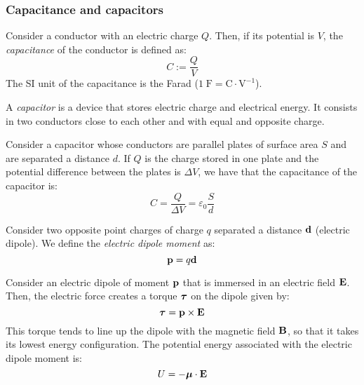 \documentclass[../../../main.tex]{subfiles}
\begin{document}
\begin{multicols}{2}
  \subsubsection*{Capacitance and capacitors}
  \begin{definition}[Capacitance]
    Consider a conductor with an electric charge $Q$. Then, if its potential is $V$, the \textit{capacitance} of the conductor is defined as: $$C:=\frac{Q}{V}$$
    The SI unit of the capacitance is the Farad ($1\;\text{F}=\text{C}\cdot\text{V}^{-1}$).
  \end{definition}
  \begin{definition}[Capacitor]
    A \textit{capacitor} is a device that stores electric charge and electrical energy. It consists in two conductors close to each other and with equal and opposite charge.
  \end{definition}
  \begin{prop}
    Consider a capacitor whose conductors are parallel plates of surface area $S$ and are separated a distance $d$. If $Q$ is the charge stored in one plate and the  potential difference between the plates is $\Delta V$, we have that the capacitance of the capacitor is: $$C=\frac{Q}{\Delta V}=\varepsilon_0\frac{S}{d}$$
  \end{prop}
  \begin{definition}
    Consider two opposite point charges of charge $q$ separated a distance $\vb{d}$ (electric dipole). We define the \textit{electric dipole moment} as: $$\vb{p}=q\vb{d}$$
  \end{definition}
  \begin{prop}
    Consider an electric dipole of moment $\vb{p}$ that is immersed in an electric field $\vb{E}$. Then, the electric force creates a torque $\vb*{\tau}$ on the dipole given by: $$\vb*{\tau}=\vb{p}\times\vb{E}$$ This torque tends to line up the dipole with the magnetic field $\vb{B}$, so that it takes its lowest energy configuration. The potential energy associated with the electric dipole moment is: $$U=-\vb*{\mu}\cdot\vb{E}$$
  \end{prop}
  \begin{center}
    \begin{minipage}{\linewidth}
      \centering
      
    \end{minipage}
  \end{center}

\end{multicols}
\end{document}
